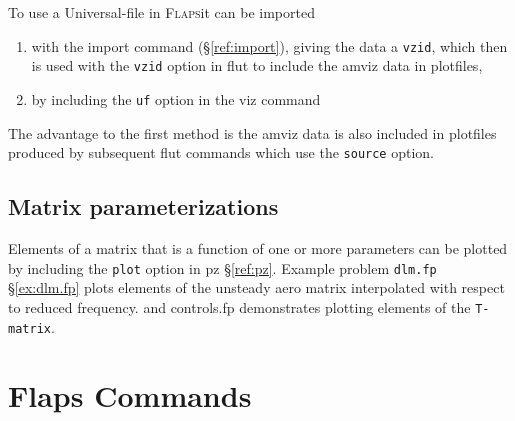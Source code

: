 \documentclass[11pt,openany,twoside]{book}
\numberwithin{equation}{section}		%
\newcommand{\Cmd}[1]{{\sf #1}}
\newcommand{\Code}[1]{{\small\tt #1}}
\newcommand{\Flaps}{\textsc{Flaps\:}}
\newcommand{\Sectref}[1]{\S\ref{#1}}
\begin{document}
To use a Universal-file in \Flaps it can be imported
\begin{enumerate}
	\item with the \Cmd{import} command (\Sectref{ref:import}), giving
		the data a \Code{vzid}, which then is used with the \Code{vzid}
		option in \Cmd{flut} to include the \Cmd{amviz} data in plotfiles,
	\item by including the \Code{uf} option in the \Cmd{viz} command
\end{enumerate}
The advantage to the first method is the \Cmd{amviz} data is also included in
plotfiles produced by subsequent \Cmd{flut} commands which use the \Code{source} option.

\section{Matrix parameterizations}\label{sect:matrix-pz}
Elements of a matrix that is a function of one or more parameters
can be plotted by including the \Code{plot} option in \Cmd{pz} \Sectref{ref:pz}.
Example problem \Code{dlm.fp} \Sectref{ex:dlm.fp} plots elements of the
unsteady aero matrix interpolated with respect to reduced frequency.
and controls.fp demonstrates plotting elements of the \Code{T-matrix}.


\newpage
\chapter{Flaps Commands}\label{chap:commands}
\end{document}

